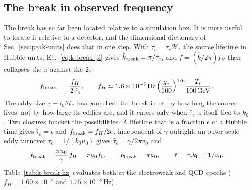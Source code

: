 \documentclass[10pt,prd,aps,nobibnotes,superscriptaddress,preprintnumbers,notitlepage]{revtex4-1}
\newcommand{\add}[1]{{\color{red}#1}}
\newcommand{\add}[1]{#1}
\begin{document}
\add{\subsection{The break in observed frequency}
\label{sec:k-break-hz}

The break has so far been located relative to a simulation box. It is more useful to
locate it relative to a detector, and the dimensional dictionary of
Sec.~\ref{sec:peak-units} does that in one step. With $\hat\tau_c=\tau_c\mathcal H_\ast$
the source lifetime in Hubble units, Eq.~\eqref{eq:k-break-pi} gives
$\hat k_{\rm break}=\pi/\hat\tau_c$, and $f=(\hat k/2\pi)f_H$ then collapses the $\pi$
against the $2\pi$:
\begin{equation}
  f_{\rm break}\;=\;\frac{f_H}{2\,\hat\tau_c},
  \qquad
  f_H\simeq1.6\times10^{-5}\,{\rm Hz}\,
  \Bigl(\frac{g_\ast}{100}\Bigr)^{1/6}\frac{T_\ast}{100\,{\rm GeV}} .
  \label{eq:f-break}
\end{equation}
The eddy size $\gamma=l_0\mathcal H_\ast$ has cancelled: the break is set by how long the
source lives, not by how large its eddies are, and it enters only when $\hat\tau_c$ is
itself tied to $k_0$. Two closures bracket the possibilities. A lifetime that is a
fraction $\epsilon$ of a Hubble time gives $\hat\tau_c=\epsilon$ and
$f_{\rm break}=f_H/2\epsilon$, independent of $\gamma$ outright; an outer-scale eddy
turnover $\tau_c=1/(k_0u_0)$ gives $\hat\tau_c=\gamma/2\pi u_0$ and
\begin{equation}
  f_{\rm break}=\frac{\pi u_0}{\gamma}\,f_H=\pi u_0 f_0,
  \qquad
  p_{\rm break}=\pi u_0,
  \qquad
  \hat\tau=\tau_ck_0=1/u_0 .
  \label{eq:f-break-eddy}
\end{equation}
Table~\ref{tab:k-break-hz} evaluates both at the electroweak and QCD epochs
($f_H=1.60\times10^{-5}$ and $1.75\times10^{-8}\,$Hz).

}
\end{document}
